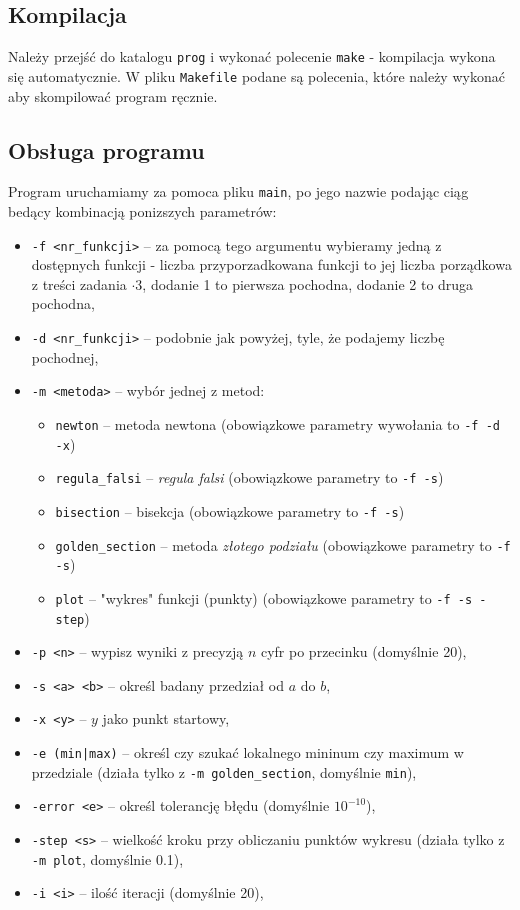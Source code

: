 \documentclass[a4paper,11pt]{article}
\begin{document}
    \subsection{Kompilacja}
    Należy przejść do katalogu \texttt{prog} i wykonać polecenie \texttt{make} - kompilacja wykona się automatycznie. W pliku \texttt{Makefile} podane są polecenia, które należy wykonać aby skompilować program ręcznie.
    
    \subsection{Obsługa programu}
    Program uruchamiamy za pomoca pliku \texttt{main}, po jego nazwie podając ciąg bedący kombinacją ponizszych parametrów:
    \begin{itemize}
      \item \texttt{-f <nr\_funkcji>} -- za pomocą tego argumentu wybieramy jedną z dostępnych funkcji - liczba przyporzadkowana funkcji to jej liczba porządkowa z treści zadania \( \cdot 3 \), dodanie 1 to pierwsza pochodna, dodanie 2 to druga pochodna,
      \item \texttt{-d <nr\_funkcji>} -- podobnie jak powyżej, tyle, że podajemy liczbę pochodnej,
      \item \texttt{-m <metoda>} -- wybór jednej z metod:
        \begin{itemize}
          \item \texttt{newton} -- metoda newtona (obowiązkowe parametry wywołania to \texttt{-f -d -x})
          \item \texttt{regula\_falsi} -- \emph{regula falsi} (obowiązkowe parametry to \texttt{-f -s})
          \item \texttt{bisection} -- bisekcja (obowiązkowe parametry to \texttt{-f -s})
          \item \texttt{golden\_section} -- metoda \emph{złotego podziału} (obowiązkowe parametry to \texttt{-f -s})
          \item \texttt{plot} -- "wykres" funkcji (punkty) (obowiązkowe parametry to \texttt{-f -s -step})
        \end{itemize}
      \item \texttt{-p <n>} -- wypisz wyniki z precyzją $n$ cyfr po przecinku (domyślnie 20),
      \item \texttt{-s <a> <b>} -- określ badany przedział od $a$ do $b$,
      \item \texttt{-x <y>} -- $y$ jako punkt startowy,
      \item \texttt{-e (min|max)} -- określ czy szukać lokalnego mininum czy maximum w przedziale (działa tylko z \texttt{-m golden\_section}, domyślnie \texttt{min}),
      \item \texttt{-error <e>} -- określ tolerancję błędu (domyślnie $ 10^{-10} $),
      \item \texttt{-step <s>} -- wielkość kroku przy obliczaniu punktów wykresu (działa tylko z \texttt{-m plot}, domyślnie 0.1),
      \item \texttt{-i <i>} -- ilość iteracji (domyślnie 20),
      
    \end{itemize}
    
\end{document}

